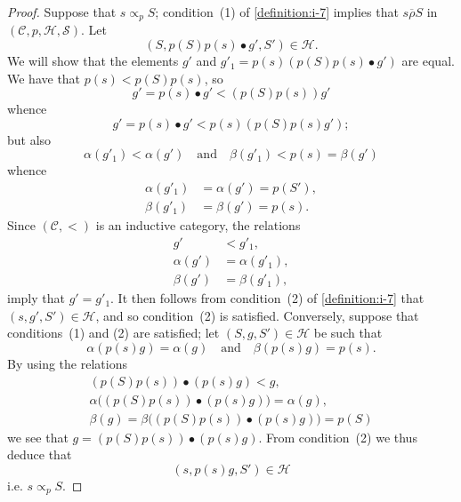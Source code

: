 \documentclass[a4paper,fleqn]{article}
\theoremstyle{plain}
\theoremstyle{definition}
\newcommand{\oldpage}[1]{{\marginpar{\footnotesize$\bigg\vert$\,\,\,\,\textit{p.~#1}}}}
\newcommand{\textand}{\quad\text{and}\quad}
\newcommand{\CC}{\mathcal{C}}
\newcommand{\HH}{\mathcal{H}}
\renewcommand{\SS}{\mathcal{S}}
\newcommand{\relrhobar}{\mathrel{\overline{\rho}}}
\newcommand{\subs}{\mathrel{\propto}}
\begin{document}
\begin{proof}
  Suppose that $s\subs_p S$;
  condition~(1) of \cref{definition:i-7} implies that $s\relrhobar S$ in $(\CC,p,\HH,\SS)$.
  Let
  \[
    (S,p(S)p(s)\bullet g',S')\in\HH.
  \]
  We will show that the elements $g'$ and $g'_1=p(s)(p(S)p(s)\bullet g')$ are equal.
  We have that $p(s)<p(S)p(s)$, so
  \[
    g'
    = p(s)\bullet g'
    < (p(S)p(s))g'
  \]
  whence
  \[
    g'
    = p(s)\bullet g'
    < p(s)(p(S)p(s)g');
  \]
  \oldpage{361}
  but also
  \[
    \alpha(g'_1)<\alpha(g')
    \textand
    \beta(g'_1)<p(s)=\beta(g')
  \]
  whence
  \[
    \begin{aligned}
      \alpha(g'_1)
      &= \alpha(g')
      = p(S'),
    \\\beta(g'_1)
      &= \beta(g')
      = p(s).
    \end{aligned}
  \]
  Since $(\CC,<)$ is an inductive category, the relations
  \[
    \begin{aligned}
      g'
      &< g'_1,
    \\\alpha(g')
      &= \alpha(g'_1),
    \\\beta(g')
      &= \beta(g'_1),
    \end{aligned}
  \]
  imply that $g'=g'_1$.
  It then follows from condition~(2) of \cref{definition:i-7} that $(s,g',S')\in\HH$, and so condition~(2\textquotesingle) is satisfied.
  Conversely, suppose that conditions~(1\textquotesingle) and (2\textquotesingle) are satisfied;
  let $(S,g,S')\in\HH$ be such that
  \[
    \alpha(p(s)g)=\alpha(g)
    \textand
    \beta(p(s)g)=p(s).
  \]
  By using the relations
  \[
    \begin{gathered}
      (p(S)p(s))\bullet(p(s)g)<g,
    \\\alpha\big((p(S)p(s))\bullet(p(s)g)\big)=\alpha(g),
    \\\beta(g)=\beta\big((p(S)p(s))\bullet(p(s)g)\big)=p(S)
    \end{gathered}
  \]
  we see that $g=(p(S)p(s))\bullet(p(s)g)$.
  From condition~(2\textquotesingle) we thus deduce that
  \[
    (s,p(s)g,S')\in\HH
  \]
  i.e. $s\subs_p S$.
\end{proof}
\end{document}
